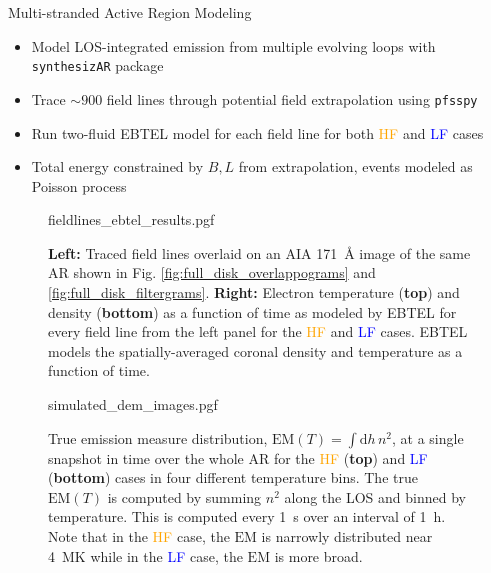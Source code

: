 \documentclass[final]{beamer}
\newlength{\colwidth}
\begin{document}
\begin{frame}[t]
\begin{columns}[t]
\begin{column}{\colwidth}
\begin{block}{Multi-stranded Active Region Modeling}
    \begin{itemize}
      \item Model \alert{LOS-integrated emission from multiple evolving loops} with \texttt{synthesizAR} package \citep{barnes_understanding_2019}
      \item Trace $\sim900$ field lines through potential field extrapolation using \texttt{pfsspy} \citep{stansby_pfsspy_2020}
      \item \alert{Run two-fluid EBTEL model \citep{klimchuk_highly_2008,barnes_inference_2016} for each field line} for both \textcolor{orange}{HF} and \textcolor{blue}{LF} cases
      \item Total energy constrained by $B,L$ from extrapolation, events modeled as Poisson process \citep{warren_observation_2020}
    \end{itemize}
    \vspace{-30px}
    \begin{figure}
      \centering
      {fieldlines_ebtel_results.pgf}
      \caption{\textbf{Left:} Traced field lines overlaid on an AIA \SI{171}{\angstrom} image of the same AR shown in Fig. \ref{fig:full_disk_overlappograms} and \ref{fig:full_disk_filtergrams}. \textbf{Right:} Electron temperature (\textbf{top}) and density (\textbf{bottom}) as a function of time as modeled by EBTEL for every field line from the left panel for the \textcolor{orange}{HF} and \textcolor{blue}{LF} cases. EBTEL models the spatially-averaged coronal density and temperature as a function of time.}
      \label{fig:fieldlines_ebtel_results}
    \end{figure}
    \vspace{-35px}
    \begin{figure}
      \centering
      {simulated_dem_images.pgf}
      \caption{True emission measure distribution, $\mathrm{EM}(T)=\int\mathrm{d}h\,n^2$, at a single snapshot in time over the whole AR for the \textcolor{orange}{HF} (\textbf{top}) and \textcolor{blue}{LF} (\textbf{bottom}) cases in four different temperature bins. The true $\mathrm{EM}(T)$ is computed by summing $n^2$ along the LOS and binned by temperature. This is computed every \SI{1}{\second} over an interval of \SI{1}{\hour}. Note that in the \textcolor{orange}{HF} case, the $\mathrm{EM}$ is narrowly distributed near \SI{4}{\mega\kelvin} while in the \textcolor{blue}{LF} case, the $\mathrm{EM}$ is more broad.}
      \label{fig:simulated_dem}
    \end{figure}


\end{block}
\end{column}
\end{columns}
\end{frame}
\end{document}

